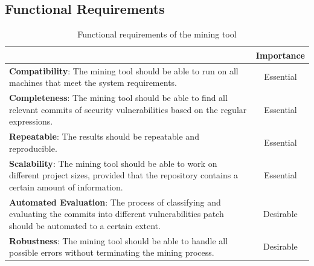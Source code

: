 \documentclass[12pt, a4paper]{report}
\begin{document}
\subsection{Functional Requirements}
\begin{table}[H]
	\begin{center}
		\begin{tabular}{|p{10.3cm}|c|}
			\hline
			\rowcolor[HTML]{D8D8D8}
			\multicolumn{1}{|c|}{Criteria} & Importance \\ \hline
			\textbf{Compatibility}: The mining tool should be able to run on all machines that meet the
			system requirements. & Essential \\ \hline
			\textbf{Completeness}: The mining tool should be able to find all relevant commits of security
			vulnerabilities based on the regular expressions. & Essential \\ \hline
			\textbf{Repeatable}: The results should be repeatable and reproducible. & Essential \\ \hline
			\textbf{Scalability}: The mining tool should be able to work on different project sizes,
			provided that the repository contains a certain amount of information. & Essential \\ \hline
			\textbf{Automated Evaluation}: The process of classifying and evaluating the commits into
      different vulnerabilities patch should be automated to a certain extent. & Desirable \\
			\textbf{Robustness}: The mining tool should be able to handle all possible errors without
			terminating the mining process. & Desirable \\ \hline
    \end{tabular}
    \caption{Functional requirements of the mining tool} \label{table:func_req}
	\end{center}
\end{table}
\end{document}
